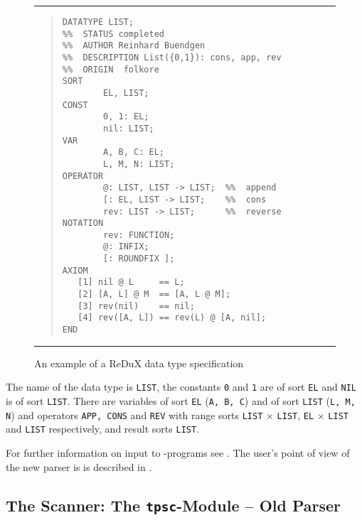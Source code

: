 \begin{figure}[htbp]
\begin{center}
\noindent
\rule{\textwidth}{0.6pt}

\begin{minipage}{5.9in} %
\begin{quote}
\begin{verbatim}
DATATYPE LIST;
%%  STATUS completed
%%  AUTHOR Reinhard Buendgen
%%  DESCRIPTION List({0,1}): cons, app, rev
%%  ORIGIN  folkore
SORT
        EL, LIST;
CONST
        0, 1: EL;
        nil: LIST;
VAR
        A, B, C: EL;
        L, M, N: LIST;
OPERATOR
        @: LIST, LIST -> LIST;  %%  append 
        [: EL, LIST -> LIST;    %%  cons
        rev: LIST -> LIST;      %%  reverse
NOTATION
        rev: FUNCTION;
        @: INFIX;
        [: ROUNDFIX ];
AXIOM
   [1] nil @ L     == L;
   [2] [A, L] @ M  == [A, L @ M];
   [3] rev(nil)    == nil;
   [4] rev([A, L]) == rev(L) @ [A, nil];
END
\end{verbatim}
\end{quote}
\end{minipage}

\noindent
\rule{\textwidth}{0.6pt}
\end{center}
\caption{An example of a ReDuX data type specification} \label{fi:exa}
\end{figure}
The name of the data type is {\tt LIST}, the constants {\tt 0} and {\tt 1}
are of sort {\tt EL} and {\tt NIL} is of sort {\tt LIST}.
There are variables of sort {\tt EL} ({\tt A, B, C}) and of sort {\tt LIST}
({\tt L, M, N}) and operators {\tt APP, CONS} and {\tt REV} with range sorts
{\tt LIST} $\times$ {\tt LIST}, {\tt EL} $\times$ {\tt LIST} and
{\tt LIST} respectively, and result sorts {\tt LIST}.

For further information on input to \redux-programs see 
\RUD.
The user's point of view of the new parser is is described in
\NPUG.

\subsection{The Scanner: The {\tt tpsc}-Module -- Old Parser}

